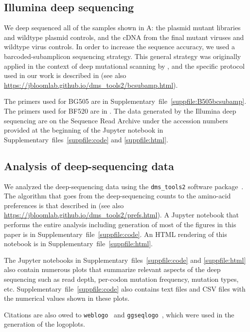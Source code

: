 \documentclass[9pt]{elife}
\begin{document}
\subsection{Illumina deep sequencing}
We deep sequenced all of the samples shown in A: the plasmid mutant libraries and wildtype plasmid controls, and the cDNA from the final mutant viruses and wildtype virus controls.
In order to increase the sequence accuracy, we used a barcoded-subamplicon sequencing strategy.
This general strategy was originally applied in the context of deep mutational scanning by \citet{wu2014high}, and the specific protocol used in our work is described in \citet{doud2016accurate} (see also \url{https://jbloomlab.github.io/dms_tools2/bcsubamp.html}).

The primers used for BG505 are in Supplementary~file~\ref{suppfile:B505bcsubamp}.
The primers used for BF520 are in \citet{dingens2017comprehensive}.
The data generated by the Illumina deep sequencing are on the Sequence Read Archive under the accession numbers provided at the beginning of the Jupyter notebook in Supplementary~files~\ref{suppfile:code} and \ref{suppfile:html}.

\subsection{Analysis of deep-sequencing data}
We analyzed the deep-sequencing data using the \texttt{dms\_tools2} software package~\citep[\url{https://jbloomlab.github.io/dms_tools2/}, version 2.2.4]{bloom2015software}.
The algorithm that goes from the deep-sequencing counts to the amino-acid preferences is that described in \citet{bloom2015software} (see also \url{https://jbloomlab.github.io/dms_tools2/prefs.html}).
A Jupyter notebook that performs the entire analysis including generation of most of the figures in this paper is in Supplementary~file~\ref{suppfile:code}.
An HTML rendering of this notebook is in Supplementary~file~\ref{suppfile:html}.

The Jupyter notebooks in Supplementary~files~\ref{suppfile:code} and \ref{suppfile:html} also contain numerous plots that summarize relevant aspects of the deep sequencing such as read depth, per-codon mutation frequency, mutation types, etc.
Supplementary~file~\ref{suppfile:code} also contains text files and CSV files with the numerical values shown in these plots.

Citations are also owed to \texttt{weblogo}~\citep[][\url{http://weblogo.threeplusone.com/}]{crooks2004weblogo} and \texttt{ggseqlogo}~\citep[][\url{https://omarwagih.github.io/ggseqlogo/}]{wagih2017ggseqlogo}, which were used in the generation of the logoplots. 
\end{document}
